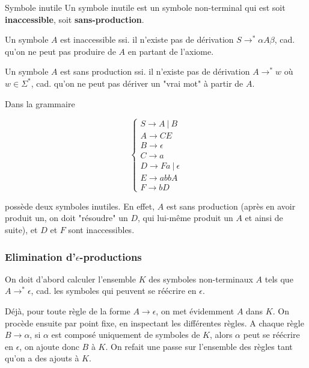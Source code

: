 \begin{definition}{Symbole inutile}{}
Un symbole inutile est un symbole non-terminal qui est soit \textbf{inaccessible}, soit \textbf{sans-production}. 

Un symbole $A$ est inaccessible ssi. il n'existe pas de dérivation $S \rightarrow^* \alpha A \beta$, cad. qu'on ne peut pas produire de $A$ en partant de l'axiome. 

Un symbole $A$ est sans production ssi. il n'existe pas de dérivation $A \rightarrow^* w$ où $w \in \Sigma^*$, cad. qu'on ne peut pas dériver un "vrai mot" à partir de $A$.
\end{definition}

\begin{example}
\label{gramsymbsinutiles1}
Dans la grammaire 

\[
\begin{cases}
S \rightarrow A~|~B \\
A \rightarrow CE \\
B \rightarrow \epsilon \\
C \rightarrow a \\
D \rightarrow Fa~|~\epsilon \\
E \rightarrow abbA \\
F \rightarrow bD
\end{cases}
\]

possède deux symboles inutiles. En effet, $A$ est sans production (après en avoir produit un, on doit "résoudre" un $D$, qui lui-même produit un $A$ et ainsi de suite), et $D$ et $F$ sont inaccessibles.

\end{example}

\subsubsection{Elimination d'$\epsilon$-productions}
\label{gramepsilon}
On doit d'abord calculer l'ensemble $K$ des symboles non-terminaux $A$ tels que $A \rightarrow^* \epsilon$, cad. les symboles qui peuvent se réécrire en $\epsilon$.

Déjà, pour toute règle de la forme $A \rightarrow \epsilon$, on met évidemment $A$ dans $K$. On procède ensuite par point fixe, en inspectant les différentes règles. A chaque règle $B \rightarrow \alpha$, si $\alpha$ est composé uniquement de symboles de $K$, alors $\alpha$ peut se réécrire en $\epsilon$, on ajoute donc $B$ à $K$. On refait une passe sur l'ensemble des règles tant qu'on a des ajouts à $K$.

